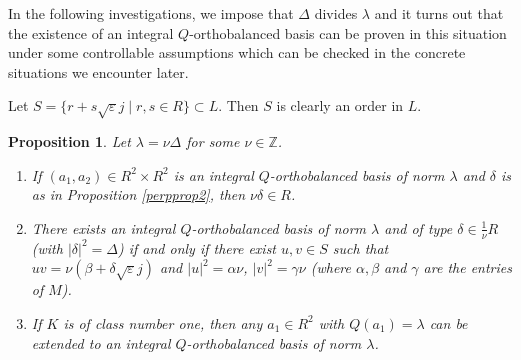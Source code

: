 \documentclass[11pt]{amsart}
\newtheorem{proposition}{Proposition}[section]
\theoremstyle{definition}
\theoremstyle{remark}
\begin{document}
In the following investigations, we impose that $\Delta$ divides
$\lambda$ and it turns out that the existence of an integral $Q$-orthobalanced basis can be proven in this situation under some controllable assumptions which can be checked in the concrete situations we encounter later.


Let $S=\{r+s\sqrt{\varepsilon}j\mid r,s\in R\}\subset L$. Then $S$ is clearly an order in $L$.

\begin{proposition}\label{integralfactorizationthm}
Let $\lambda=\nu\Delta$ for some $\nu\in\mathbb Z$.
\begin{enumerate}
\item If $(a_1,a_2)\in R^2\times R^2$
is an integral $Q$-orthobalanced basis of norm $\lambda$ and $\delta$ is as in Proposition \ref{perpprop2}, then $\nu\delta\in R$.
\item There exists an integral $Q$-orthobalanced basis of norm $\lambda$ and of type $\delta\in\frac{1}{\nu} R$ (with $|\delta|^2=\Delta$) if and only if there exist $u,v\in S$ such that $uv=\nu(\beta+\delta\sqrt{\varepsilon}j)$ and $|u|^2=\alpha\nu$, $|v|^2=\gamma\nu$ (where $\alpha,\beta$ and $\gamma$ are the entries of $M$).
\item If $K$ is of class number one, then any $a_1\in R^2$
with $Q(a_1)=\lambda$ can be extended to an integral $Q$-orthobalanced basis of norm $\lambda$.
\end{enumerate}
\end{proposition}
\end{document}
